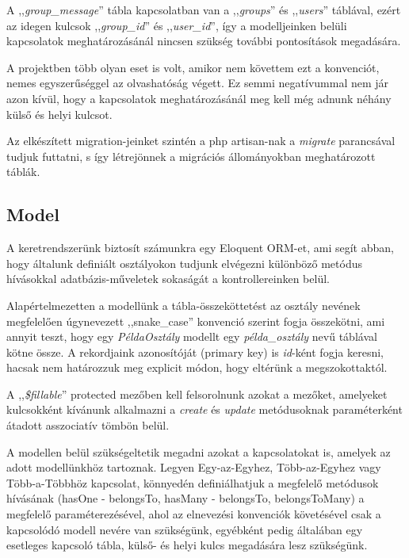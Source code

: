 \documentclass[
]{thesis-ekf}
\theoremstyle{definition}
\theoremstyle{remark}
\begin{document}
                    A ,,\emph{group\_message}'' tábla kapcsolatban van a ,,\emph{groups}'' és ,,\emph{users}'' táblával, ezért az idegen kulcsok ,,\emph{group\_id}'' és ,,\emph{user\_id}'', így a modelljeinken belüli kapcsolatok meghatározásánál nincsen szükség további pontosítások megadására. 

                    A projektben több olyan eset is volt, amikor nem követtem ezt a konvenciót, nemes egyszerűséggel az olvashatóság végett. Ez semmi negatívummal nem jár azon kívül, hogy a kapcsolatok meghatározásánál meg kell még adnunk néhány külső és helyi kulcsot.

                    Az elkészített migration-jeinket szintén a php artisan-nak a \emph{migrate} parancsával tudjuk futtatni, s így létrejönnek a migrációs állományokban meghatározott táblák.
                    
                \subsection{Model}
                    A keretrendszerünk biztosít számunkra egy Eloquent ORM-et\cite{Laravel-Models}, ami segít abban, hogy általunk definiált osztályokon tudjunk elvégezni különböző metódus hívásokkal adatbázis-műveletek sokaságát a kontrollereinken belül.

                    Alapértelmezetten a modellünk a tábla-összeköttetést az osztály nevének megfelelően úgynevezett ,,snake\_case'' konvenció szerint fogja összekötni, ami annyit teszt, hogy egy \emph{PéldaOsztály} modellt egy \emph{példa\_osztály} nevű táblával kötne össze. A rekordjaink azonosítóját (primary key) is \emph{id}-ként fogja keresni, hacsak nem határozzuk meg explicit módon, hogy eltérünk a megszokottaktól.

                    A ,,\emph{\$fillable}'' protected mezőben kell felsorolnunk azokat a mezőket, amelyeket kulcsokként kívánunk alkalmazni a \emph{create} és \emph{update} metódusoknak paraméterként átadott asszociatív tömbön belül.

                    A modellen belül szükségeltetik megadni azokat a kapcsolatokat is, amelyek az adott modellünkhöz tartoznak. Legyen Egy-az-Egyhez, Több-az-Egyhez vagy Több-a-Többhöz kapcsolat, könnyedén definiálhatjuk a megfelelő metódusok hívásának (hasOne - belongsTo, hasMany - belongsTo, belongsToMany) a megfelelő paraméterezésével, ahol az elnevezési konvenciók követésével csak a kapcsolódó modell nevére van szükségünk, egyébként pedig általában egy esetleges kapcsoló tábla, külső- és helyi kulcs megadására lesz szükségünk.
                    
\end{document}
